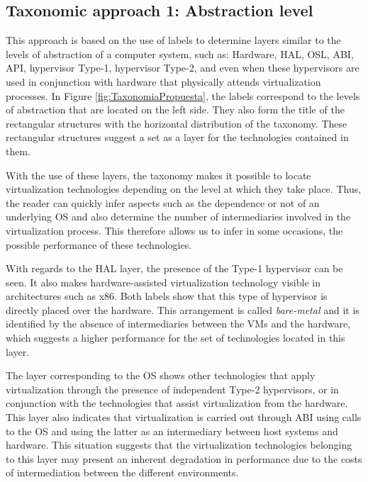 	
	
	\subsection{Taxonomic approach 1: Abstraction level}

	This approach is based on the use of labels to determine layers similar to the levels of abstraction of a computer system, such as: Hardware, HAL, OSL, ABI, API, hypervisor Type-1, hypervisor Type-2, and even when these hypervisors are used in conjunction with hardware that physically attends virtualization processes. In Figure \ref{fig:TaxonomiaPropuesta}, the labels correspond to the levels of abstraction that are located on the left side. They also form the title of the rectangular structures with the horizontal distribution of the taxonomy. These rectangular structures suggest a set as a layer for the technologies contained in them.
	
	With the use of these layers, the taxonomy makes it possible to locate virtualization technologies depending on the level at which they take place. Thus, the reader can quickly infer aspects such as the dependence or not of an underlying OS and also determine the number of intermediaries involved in the virtualization process. This therefore allows us to infer in some occasions, the possible performance of these technologies.
	
	With regards to the HAL layer, the presence of the Type-1 hypervisor can be seen. It also makes hardware-assisted virtualization technology visible in architectures such as x86. Both labels show that this type of hypervisor is directly placed over the hardware.  This arrangement is called \textit{bare-metal} and it is identified by the absence of intermediaries between the VMs and the hardware, which suggests a higher performance for the set of technologies located in this layer.
	
	The layer corresponding to the OS shows other technologies that apply virtualization through the presence of independent Type-2 hypervisors, or in conjunction with the technologies that assist virtualization from the hardware. This layer also indicates that virtualization is carried out through ABI using calls to the OS and using the latter as an intermediary between host systems and hardware. This situation suggests that the virtualization technologies belonging to this layer may present an inherent degradation in performance due to the costs of intermediation between the different environments.
	
